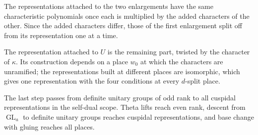 The representations attached to the two enlargements have the same characteristic polynomials once each
is multiplied by the added characters of the other. Since the added characters differ, those of the
first enlargement split off from its representation one at a time.

The representation attached to $U$ is the remaining part, twisted by the character of $\kappa$. Its
construction depends on a place $w_0$ at which the characters are unramified; the representations built
at different places are isomorphic, which gives one representation with the four conditions at every
$d$-split place.

The last step passes from definite unitary groups of odd rank to all cuspidal representations in the
self-dual scope. Theta lifts reach even rank, descent from $\operatorname{GL}_a$ to definite unitary
groups reaches cuspidal representations, and base change with gluing reaches all places.
